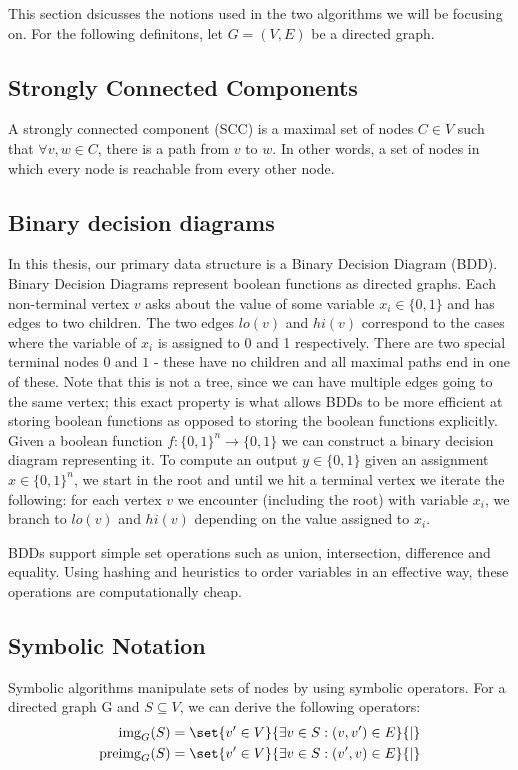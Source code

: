 \documentclass[../master/master.tex]{subfiles}
\begin{document}
This section dsicusses the notions used in the two algorithms we will be focusing on. For the following definitons, let $G=(V,E)$ be a directed graph.

\subsection{Strongly Connected Components}
A strongly connected component (SCC) is a maximal set of nodes $C\in V$ such that $\forall v,w\in C$, there is a path from $v$ to $w$. In other words, a set of nodes in which every node is reachable from every other node.

\subsection{Binary decision diagrams}
In this thesis, our primary data structure is a Binary Decision Diagram (BDD). Binary Decision Diagrams represent boolean functions as directed graphs. Each non-terminal vertex $v$ asks about the value of some variable $x_i\in \{0,1\}$ and has edges to two children. The two edges $lo(v)$ and $hi(v)$ correspond to the cases where the variable of $x_i$ is assigned to 0 and 1 respectively. There are two special terminal nodes $0$ and $1$ - these have no children and all maximal paths end in one of these. Note that this is not a tree, since we can have multiple edges going to the same vertex; this exact property is what allows BDDs to be more efficient at storing boolean functions as opposed to storing the boolean functions explicitly.
Given a boolean function $f: \{0,1\}^n \rightarrow \{0,1\}$ we can construct a binary decision diagram representing it. To compute an output $y\in \{0,1\}$ given an assignment  $x\in\{0,1\}^n$, we start in the root and until we hit a terminal vertex we iterate the following: for each vertex $v$ we encounter (including the root) with variable $x_i$, we branch to $lo(v)$ and $hi(v)$ depending on the value assigned to $x_i$.

BDDs support simple set operations such as union, intersection, difference and equality. Using hashing and heuristics to order variables in an effective way, these operations are computationally cheap.\\[2mm]

\subsection{Symbolic Notation}
Symbolic algorithms manipulate sets of nodes by using symbolic operators. For a directed graph G and $S\subseteq V$, we can derive the following operators: 
\begin{align*}
\img S &= \set{v' \in V}{\exists v\in S:(v, v')\in E}{|}\\
\pre S &= \set{v' \in V}{\exists v\in S:(v', v)\in E}{|}
\end{align*}
\end{document}
